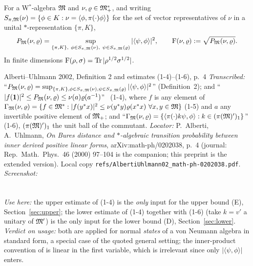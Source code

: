 \documentclass[11pt]{article}
\newcommand{\ip}[2]{\langle #1,#2\rangle}
\newcommand{\one}{\mathbf 1}
\begin{document}
\begin{definition}\label{def:P}
For a W$^*$-algebra $\mathfrak M$ and $\nu,\varrho\in\mathfrak M^*_+$, and writing $S_{\pi,\cM}(\nu)=\{\phi\in K:
\nu=\ip{\phi}{\pi(\cdot)\phi}\}$ for the set of vector representatives of $\nu$ in a unital $*$-representation
$\{\pi,K\}$,
\[
 P_{\cM}(\nu,\varrho)=\sup_{\{\pi,K\},\ \phi\in S_{\pi,\cM}(\nu),\ \psi\in S_{\pi,\cM}(\varrho)}|\ip{\psi}{\phi}|^2,
 \qquad \Fid(\nu,\varrho):=\sqrt{P_{\cM}(\nu,\varrho)} .
\]
In finite dimensions $\operatorname{F}(\rho,\sigma)=\operatorname{Tr}|\rho^{1/2}\sigma^{1/2}|$.
\end{definition}

\begin{citedbox}{Alberti--Uhlmann 2002, Definition 2 and estimates (1-4)--(1-6), p.~4}
\emph{Transcribed:} ``$P_{\mathfrak M}(\nu,\varrho)=\sup_{\{\pi,K\},\phi\in S_{\pi,\mathfrak M}(\nu),\psi\in S_{\pi,\mathfrak M}(\varrho)}
|\langle\psi,\phi\rangle|^2$'' (Definition~2); and
``$|f(\one)|^2\le P_{\cM}(\nu,\varrho)\le\nu(a)\varrho(a^{-1})$'' \ (1-4), where $f$ is any element of
$\Gamma_{\cM}(\nu,\varrho)=\{f\in\cM^*:|f(y^*x)|^2\le\nu(y^*y)\varrho(x^*x)\ \forall x,y\in\cM\}$ (1-5) and $a$ any
invertible positive element of $\mathfrak M_+$; and
``$\Gamma_{\mathfrak M}(\nu,\varrho)=\{\langle\pi(\cdot)k\psi,\phi\rangle:k\in(\pi(\mathfrak M)')_1\}$'' (1-6),
$(\pi(\mathfrak M)')_1$ the unit ball of the commutant.
\emph{Locator:} P.~Alberti, A.~Uhlmann, \emph{On Bures distance and $*$-algebraic transition probability between inner
derived positive linear forms}, arXiv:math-ph/0202038, p.~4 (journal: Rep.\ Math.\ Phys.\ 46 (2000) 97--104 is the
companion; this preprint is the extended version).  Local copy \texttt{refs/AlbertiUhlmann02\_math-ph-0202038.pdf}.
\emph{Screenshot:}\\
\\
\\
\emph{Use here:} the upper estimate of (1-4) is the \emph{only} input for the upper bound (E),
Section~\ref{sec:upper}; the lower estimate of (1-4) together with (1-6) (take $k=v'$ a unitary of $\mathfrak M'$) is the
only input for the lower bound (D), Section~\ref{sec:lower}.  \emph{Verdict on usage:} both are applied for normal
\emph{states} of a von Neumann algebra in standard form, a special case of the quoted general setting; the
inner-product convention of \cite{AU02} is linear in the first variable, which is irrelevant since only
$|\ip\psi\phi|$ enters.
\end{citedbox}
\end{document}

